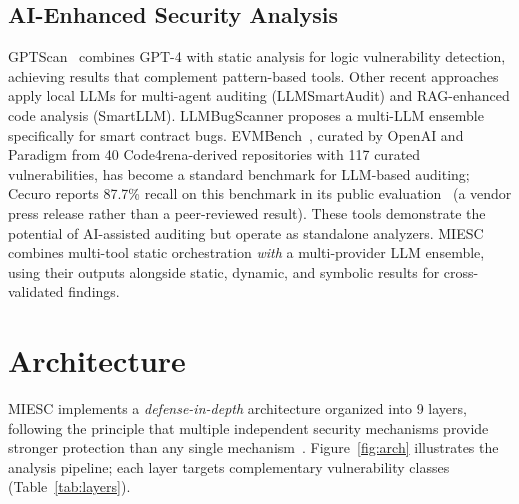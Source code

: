 \documentclass[conference]{IEEEtran}
\begin{document}
\subsection{AI-Enhanced Security Analysis}

GPTScan~\cite{sun2024gptscan} combines GPT-4 with static analysis for logic vulnerability detection, achieving results that complement pattern-based tools. Other recent approaches apply local LLMs for multi-agent auditing (LLMSmartAudit) and RAG-enhanced code analysis (SmartLLM). LLMBugScanner proposes a multi-LLM ensemble specifically for smart contract bugs. EVMBench~\cite{evmbench2026}, curated by OpenAI and Paradigm from 40 Code4rena-derived repositories with 117 curated vulnerabilities, has become a standard benchmark for LLM-based auditing; Cecuro reports 87.7\% recall on this benchmark in its public evaluation~\cite{cecuro2026} (a vendor press release rather than a peer-reviewed result). These tools demonstrate the potential of AI-assisted auditing but operate as standalone analyzers. MIESC combines multi-tool static orchestration \emph{with} a multi-provider LLM ensemble, using their outputs alongside static, dynamic, and symbolic results for cross-validated findings.

\section{Architecture}

MIESC implements a \emph{defense-in-depth} architecture organized into 9 layers, following the principle that multiple independent security mechanisms provide stronger protection than any single mechanism~\cite{saltzer1975protection}. Figure~\ref{fig:arch} illustrates the analysis pipeline; each layer targets complementary vulnerability classes (Table~\ref{tab:layers}).
\end{document}
